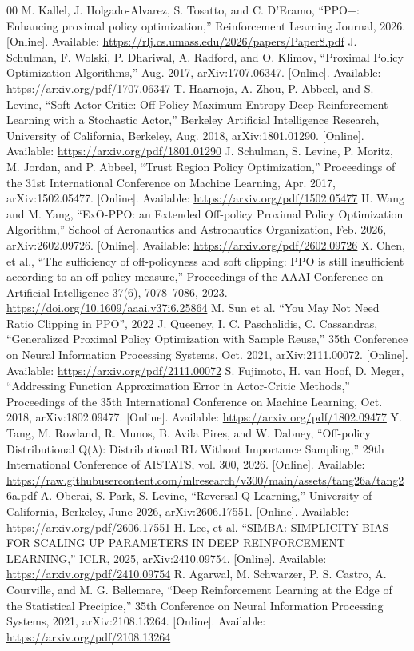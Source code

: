 \documentclass[conference]{IEEEtran}
\begin{document}
\begin{thebibliography}{00}
 M. Kallel, J. Holgado-Alvarez, S. Tosatto, and C. D'Eramo, ``PPO+: Enhancing proximal policy optimization,'' Reinforcement Learning Journal, 2026. [Online]. Available: \url{https://rlj.cs.umass.edu/2026/papers/Paper8.pdf}
 J. Schulman, F. Wolski, P. Dhariwal, A. Radford, and O. Klimov, ``Proximal Policy Optimization Algorithms,'' Aug. 2017, arXiv:1707.06347. [Online]. Available: \url{https://arxiv.org/pdf/1707.06347}
 T. Haarnoja, A. Zhou, P. Abbeel, and S. Levine, ``Soft Actor-Critic: Off-Policy Maximum Entropy Deep Reinforcement Learning with a Stochastic Actor,'' Berkeley Artificial Intelligence Research, University of California, Berkeley, Aug. 2018, arXiv:1801.01290. [Online]. Available: \url{https://arxiv.org/pdf/1801.01290}
 J. Schulman, S. Levine, P. Moritz, M. Jordan, and P. Abbeel, ``Trust Region Policy Optimization,'' Proceedings of the 31st International Conference on Machine Learning, Apr. 2017, arXiv:1502.05477. [Online]. Available: \url{https://arxiv.org/pdf/1502.05477}
 H. Wang and M. Yang, ``ExO-PPO: an Extended Off-policy Proximal Policy Optimization Algorithm,'' School of Aeronautics and Astronautics Organization, Feb. 2026, arXiv:2602.09726. [Online]. Available: \url{https://arxiv.org/pdf/2602.09726}
 X. Chen, et al., ``The sufficiency of off-policyness and soft clipping: PPO is still insufficient according to an off-policy measure,'' Proceedings of the AAAI Conference on Artificial Intelligence 37(6), 7078–7086, 2023. \url{https://doi.org/10.1609/aaai.v37i6.25864}
 M. Sun et al. ``You May Not Need Ratio Clipping in PPO'', 2022
 J. Queeney, I. C. Paschalidis, C. Cassandras, ``Generalized Proximal Policy Optimization with Sample Reuse,'' 35th Conference on Neural Information Processing Systems, Oct. 2021, arXiv:2111.00072. [Online]. Available: \url{https://arxiv.org/pdf/2111.00072}
 S. Fujimoto, H. van Hoof, D. Meger, ``Addressing Function Approximation Error in Actor-Critic Methods,'' Proceedings of the 35th International Conference on Machine Learning, Oct. 2018, arXiv:1802.09477. [Online]. Available: \url{https://arxiv.org/pdf/1802.09477}
 Y. Tang, M. Rowland, R. Munos, B. Avila Pires, and W. Dabney, ``Off-policy Distributional Q($\lambda$): Distributional RL Without Importance Sampling,'' 29th International Conference of AISTATS, vol. 300, 2026. [Online]. Available: \url{https://raw.githubusercontent.com/mlresearch/v300/main/assets/tang26a/tang26a.pdf}
 A. Oberai, S. Park, S. Levine, ``Reversal Q-Learning,'' University of California, Berkeley, June 2026, arXiv:2606.17551. [Online]. Available: \url{https://arxiv.org/pdf/2606.17551}
 H. Lee, et al. ``SIMBA: SIMPLICITY BIAS FOR SCALING UP PARAMETERS IN DEEP REINFORCEMENT LEARNING,'' ICLR, 2025, arXiv:2410.09754. [Online]. Available: \url{https://arxiv.org/pdf/2410.09754}
 R. Agarwal, M. Schwarzer, P. S. Castro, A. Courville, and M. G. Bellemare, ``Deep Reinforcement Learning at the Edge of the Statistical Precipice,'' 35th Conference on Neural Information Processing Systems, 2021, arXiv:2108.13264. [Online]. Available: \url{https://arxiv.org/pdf/2108.13264}
\end{thebibliography}
\end{document}
